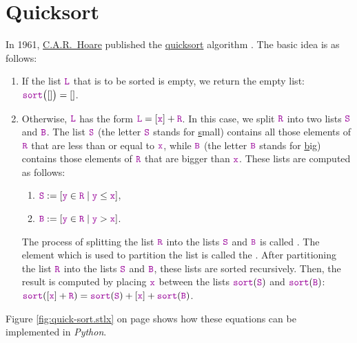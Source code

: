 \section{Quicksort}
In 1961, \href{http://en.wikipedia.org/wiki/Tony_Hoare}{C.A.R.~Hoare}  published the
\href{http://en.wikipedia.org/wiki/Quicksort}{quicksort} algorithm \cite{hoare:61}.  
The basic idea is as follows:
\begin{enumerate}
\item If the list $\mytt{L}$ that is to be sorted is empty, we return  the empty list: 
      \\[0.2cm]
      \hspace*{1.3cm} $\mytt{sort}\bigl([]\bigr) = []$.
\item Otherwise, $\mytt{L}$ has the form $\mytt{L} = [\mytt{x}] + \mytt{R}$.  In this case, we split $\mytt{R}$ into two lists $\mytt{S}$ and $\mytt{B}$.
      The list $\mytt{S}$ (the letter $\mytt{S}$ stands for \underline{s}mall) contains all those elements of $\mytt{R}$ that are less
      than or equal to $\mytt{x}$,     while $\mytt{B}$ (the letter $\mytt{B}$ stands for \underline{b}ig) contains
      those elements of $\mytt{R}$ that are bigger than $\mytt{x}$.  These lists are computed as follows:
      \begin{enumerate}
      \item $\mytt{S} := [\mytt{y} \in \mytt{R} \mid \mytt{y} \leq \mytt{x}]$,
      \item $\mytt{B} := [\mytt{y} \in \mytt{R} \mid \mytt{y} > \mytt{x}]$.
      \end{enumerate}
      The process of splitting the list $\mytt{R}$ into the lists $\mytt{S}$ and $\mytt{B}$
      is called .  The element  which is used to partition
      the list is called the .
      After partitioning the list $\mytt{R}$ into the lists $\mytt{S}$ and $\mytt{B}$, these lists are sorted 
      recursively.  Then, the result is computed by placing $\mytt{x}$ between the lists $\mytt{sort}(\mytt{S})$ and $\mytt{sort}(\mytt{B})$:
      \\[0.2cm]
      \hspace*{1.3cm}
      $\mytt{sort}([\mytt{x}]+\mytt{R}) = \mytt{sort}(\mytt{S}) + [\mytt{x}] + \mytt{sort}(\mytt{B})$.
\end{enumerate}
Figure \ref{fig:quick-sort.stlx} on page \pageref{fig:quick-sort.stlx} shows how these equations can
be implemented in \textsl{Python}.

